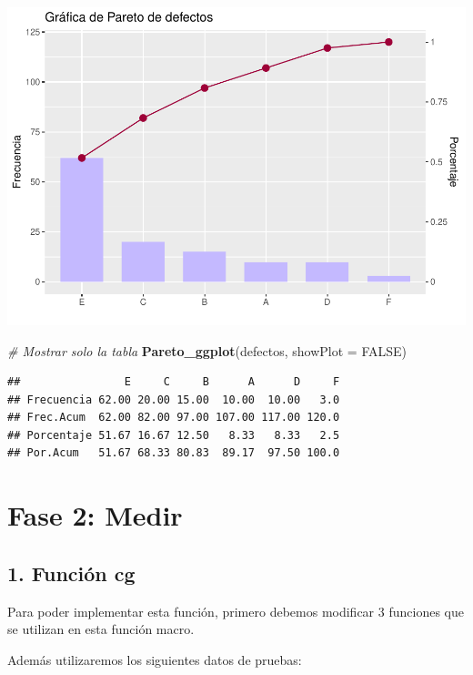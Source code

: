 \documentclass[
]{book}
\newenvironment{Shaded}{\begin{snugshade}}{\end{snugshade}}
\newcommand{\AttributeTok}[1]{\textcolor[rgb]{0.13,0.29,0.53}{#1}}
\newcommand{\CommentTok}[1]{\textcolor[rgb]{0.56,0.35,0.01}{\textit{#1}}}
\newcommand{\ConstantTok}[1]{\textcolor[rgb]{0.56,0.35,0.01}{#1}}
\newcommand{\FunctionTok}[1]{\textcolor[rgb]{0.13,0.29,0.53}{\textbf{#1}}}
\newcommand{\NormalTok}[1]{#1}
\begin{document}
\includegraphics{Libro_TidyQualityTools_files/figure-latex/unnamed-chunk-139-1.pdf}

\begin{Shaded}
\begin{Highlighting}[]
\CommentTok{\# Mostrar solo la tabla}
\FunctionTok{Pareto\_ggplot}\NormalTok{(defectos, }\AttributeTok{showPlot =} \ConstantTok{FALSE}\NormalTok{)}
\end{Highlighting}
\end{Shaded}

\begin{verbatim}
##                E     C     B      A      D     F
## Frecuencia 62.00 20.00 15.00  10.00  10.00   3.0
## Frec.Acum  62.00 82.00 97.00 107.00 117.00 120.0
## Porcentaje 51.67 16.67 12.50   8.33   8.33   2.5
## Por.Acum   51.67 68.33 80.83  89.17  97.50 100.0
\end{verbatim}

\hypertarget{fase-2-medir-1}{%
\section{Fase 2: Medir}\label{fase-2-medir-1}}

\hypertarget{funciuxf3n-cg}{%
\subsection{1. Función cg}\label{funciuxf3n-cg}}

Para poder implementar esta función, primero debemos modificar 3 funciones que se utilizan en esta función macro.

Además utilizaremos los siguientes datos de pruebas:
\end{document}
